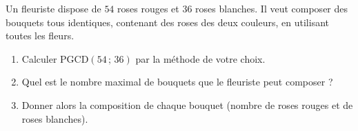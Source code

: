 \documentclass[11pt]{article}
\begin{document}
\begin{exercice}
Un fleuriste dispose de $54$ roses rouges et $36$ roses blanches. Il veut composer des bouquets tous identiques, contenant des roses des deux couleurs, en utilisant toutes les fleurs.
\begin{enumerate}
  \item Calculer $\mathrm{PGCD}(54\,;\,36)$ par la méthode de votre choix.
  \item Quel est le nombre maximal de bouquets que le fleuriste peut composer ?
  \item Donner alors la composition de chaque bouquet (nombre de roses rouges et de roses blanches).
\end{enumerate}
\end{exercice}
\end{document}
